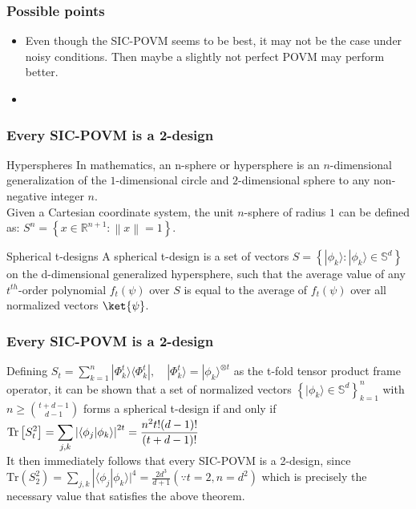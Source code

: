 \documentclass{beamer}
\begin{document}
\begin{frame}
  \frametitle{Possible points}
  \begin{itemize}
    \item Even though the SIC-POVM seems to be best, it may not be the case
          under noisy conditions. Then maybe a slightly not perfect POVM may
          perform better.
    \item
  \end{itemize}
\end{frame}

\begin{frame}
  \frametitle{Every SIC-POVM is a 2-design}
  \begin{block}{Hyperspheres}
    In mathematics, an n-sphere or hypersphere is an ${\displaystyle
          n}$-dimensional generalization of the ${\displaystyle 1}$-dimensional
    circle and ${\displaystyle 2}$-dimensional sphere to any non-negative
    integer ${\displaystyle n}$. \\
    Given a Cartesian coordinate system, the unit ${\displaystyle n}$-sphere
    of radius ${\displaystyle 1}$ can be defined as: ${\displaystyle S^{n}=\left\{x\in \mathbb {R} ^{n+1}:
          \left\|x\right\|=1\right\}.}$
  \end{block}
  \begin{block}{Spherical t-designs}
    A spherical t-design is a set of vectors ${\displaystyle S=\left\{|\phi _{k}\rangle :|\phi _{k}\rangle \in \mathbb {S}
          ^{d}\right\}}$ on the d-dimensional generalized hypersphere, such that the
    average value of any ${\displaystyle t^{th}}$-order polynomial
    ${\displaystyle f_{t}(\psi )}$ over ${\displaystyle S}$ is equal to the
    average of ${\displaystyle f_{t}(\psi )}$ over all normalized
    vectors $\ket{\psi}$.
  \end{block}
\end{frame}

\begin{frame}
  \frametitle{Every SIC-POVM is a 2-design}
  Defining
  ${\displaystyle S_{t}=\displaystyle \sum
        _{k=1}^{n}|\Phi _{k}^{t}\rangle \langle \Phi _{k}^{t}|,\quad |\Phi
        _{k}^{t}\rangle =|\phi _{k}\rangle ^{\otimes t}}$ as the t-fold tensor
  product frame operator,
  it can be shown that a set of normalized vectors
  ${\displaystyle \left\{|\phi _{k}\rangle \in
    \mathbb {S} ^{d}\right\}_{k=1}^{n}}$ with
  ${\displaystyle n\geq \binom{t+d-1}{d-1}}$ forms a spherical t-design if and
  only if ${\displaystyle \displaystyle \mathrm {Tr}
    \left[S_{t}^{2}\right]=\sum _{j,k}\left|\langle \phi _{j}|\phi _{k}\rangle
    \right|^{2t}={\frac {n^{2}t!(d-1)!}{(t+d-1)!}}}$\\
  It then immediately follows that every SIC-POVM is a 2-design, since
  ${\displaystyle \mathrm {Tr} (S_{2}^{2})=\displaystyle
    \sum _{j,k}|\langle \phi _{j}|\phi _{k}\rangle |^{4}={\frac {2d^{3}}{d+1}}} (\because t=2, n=d^{2})$
  which is precisely the necessary value that satisfies the above theorem.
\end{frame}
\end{document}

